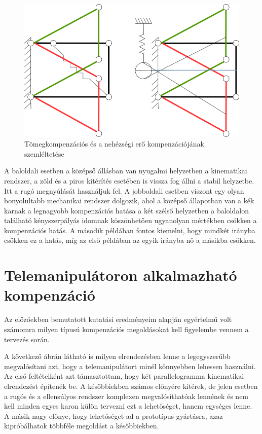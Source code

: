 \begin{figure}[!ht]
\centering
\includegraphics[width=125mm, keepaspectratio]{figures/Diagrammok/Tomeg_VS_Gravkomp}
\caption{Tömegkompenzációs és a nehézségi erő kompenzációjának szemléltetése}
\label{fig:Tomeg_VS_Gravkomp}
\end{figure}

A baloldali esetben a középső állásban van nyugalmi helyzetben a kinematikai rendszer, a zöld  és a piros kitérítés esetében is vissza fog állni a stabil helyzetbe. Itt a rugó megnyúlását használjuk fel. A jobboldali esetben viszont egy olyan bonyolultabb mechanikai rendszer dolgozik, ahol a középső állapotban van a kék karnak a legnagyobb kompenzációs hatása a két szélső helyzetben a baloldalon található kényszerpályás idomnak köszönhetően ugyanolyan mértékben csökken a kompenzációs hatás. A második példában fontos kiemelni, hogy mindkét irányba csökken ez a hatás, míg az első példában az egyik irányba nő a másikba csökken.

\section{Telemanipulátoron alkalmazható kompenzáció}

Az előzőekben bemutatott kutatási eredményeim alapján egyértelmű volt számomra milyen típusú kompenzációs megoldásokat kell figyelembe vennem a tervezés során.

A következő ábrán látható is milyen elrendezésben lenne a legegyszerűbb megvalósítani azt, hogy a telemanipulátort minél könnyebben lehessen használni. Az első feltételként azt támasztottam, hogy két parallelogramma kinematikai elrendezést építenék be. A későbbiekben számos előnyére kitérek, de jelen esetben a rugós és a ellensúlyos rendszer komplexen megvalósíthatóak lennének és nem kell minden egyes karon külön tervezni ezt a lehetőséget, hanem egységes lenne. A másik nagy előnye, hogy lehetőséget ad a prototípus gyártásra, azaz kipróbálhatok többféle megoldást a későbbiekben.\cite{gravkomp}

